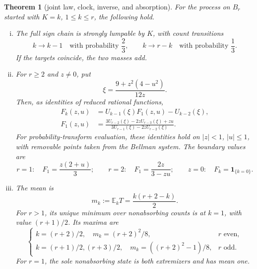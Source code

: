 \documentclass[a4paper,10pt]{amsart}
\newtheorem{theorem}{Theorem}
\theoremstyle{remark}
\newcommand{\E}{\mathbb E}
\newcommand{\Br}{B_r}
\begin{document}
\begin{theorem}[joint law, clock, inverse, and absorption]\label{thm:main}
For the process on $\Br$ started with $K=k$, $1\leq k\leq r$, the following
hold.
\begin{enumerate}[(i)]
\item The full sign chain is strongly lumpable by $K$, with count transitions
\begin{equation}\label{eq:quotient}
 k\longrightarrow k-1\quad\text{with probability }\frac23,
 \qquad
 k\longrightarrow r-k\quad\text{with probability }\frac13.
\end{equation}
If the targets coincide, the two masses add.

\item For $r\geq2$ and $z\neq0$, put
\begin{equation}\label{eq:xi}
 \xi=\frac{9+z^2(4-u^2)}{12z}.
\end{equation}
Then, as identities of reduced rational functions,
\begin{align}
 F_k(z,u)&=U_{k-1}(\xi)F_1(z,u)-U_{k-2}(\xi),
       \label{eq:Fk}\\
 F_1(z,u)&=
 \frac{3U_{r-2}(\xi)-2zU_{r-3}(\xi)+zu}
      {3U_{r-1}(\xi)-2zU_{r-2}(\xi)}.             \label{eq:F1}
\end{align}
For probability-transform evaluation, these identities hold on
$|z|<1$, $|u|\leq1$, with removable points taken from the Bellman system.
The boundary values are
\begin{equation}\label{eq:small-boundaries}
 r=1:\quad F_1=\frac{z(2+u)}3;\qquad
 r=2:\quad F_1=\frac{2z}{3-zu};\qquad
 z=0:\quad F_k=\mathbf 1_{\{k=0\}}.
\end{equation}

\item The mean is
\begin{equation}\label{eq:mean}
 m_k:=\E_kT=\frac{k(r+2-k)}2.
\end{equation}
For $r>1$, its unique minimum over nonabsorbing counts is at $k=1$,
with value $(r+1)/2$.  Its maxima are
\begin{equation}\label{eq:extrema}
 \begin{cases}
 k=(r+2)/2,\quad m_k=(r+2)^2/8, & r\text{ even},\\
 k=(r+1)/2,(r+3)/2,\quad m_k=((r+2)^2-1)/8,
   & r\text{ odd}.
 \end{cases}
\end{equation}
For $r=1$, the sole nonabsorbing state is both extremizers and has mean one.


\end{enumerate}
\end{theorem}
\end{document}
